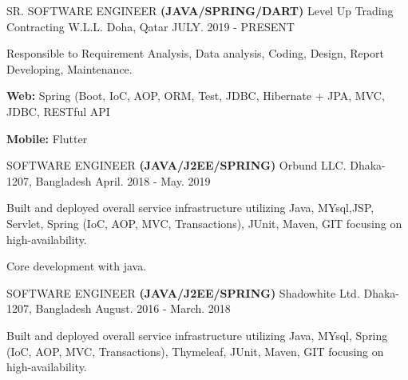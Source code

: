 

\begin{cventries}

\cventry
{SR. SOFTWARE ENGINEER \textbf{(JAVA/SPRING/DART)}} %
{Level Up Trading Contracting W.L.L.} %
{ Doha, Qatar} %
{JULY. 2019 - PRESENT} %
{
	\begin{cvitems} %
		\item {Responsible to Requirement Analysis, Data analysis, Coding, Design, Report Developing, Maintenance.}
		\item {\textbf{Web: }Spring (Boot, IoC, AOP, ORM, Test, JDBC, Hibernate + JPA, MVC, JDBC, RESTful API}
		\item {\textbf{Mobile: }Flutter}
	\end{cvitems}
}

\cventry
{SOFTWARE ENGINEER \textbf{(JAVA/J2EE/SPRING)}} %
{Orbund LLC.} %
{ Dhaka-1207, Bangladesh} %
{April. 2018 - May. 2019} %
{
	\begin{cvitems} %
		\item {Built and deployed overall service infrastructure utilizing Java, MYsql,JSP, Servlet, Spring (IoC, AOP, MVC, Transactions), JUnit, Maven, GIT focusing
			on high-availability. }
		\item {Core development with java.}
	\end{cvitems}
}

\cventry
{SOFTWARE ENGINEER \textbf{(JAVA/J2EE/SPRING)}} %
{Shadowhite Ltd.} %
{ Dhaka-1207, Bangladesh} %
{August. 2016 - March. 2018} %
{
	\begin{cvitems} %
		\item {Built and deployed overall service infrastructure utilizing Java, MYsql, Spring (IoC, AOP, MVC, Transactions), Thymeleaf, JUnit, Maven, GIT focusing
			on high-availability. }
	\end{cvitems}
}



\end{cventries}

